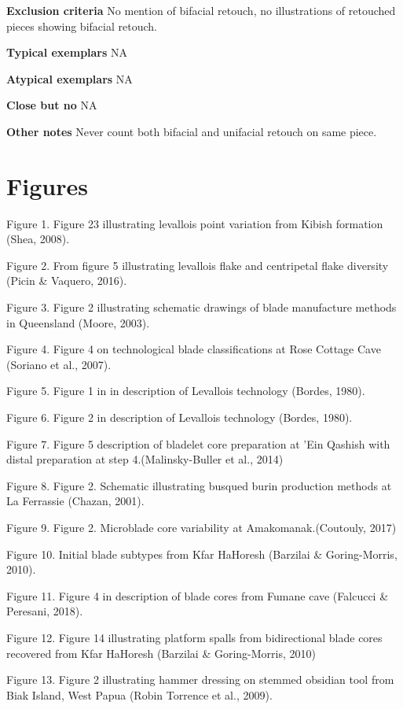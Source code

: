\documentclass[
]{article}
\begin{document}
\textbf{Exclusion criteria} No mention of bifacial retouch, no
illustrations of retouched pieces showing bifacial retouch.

\textbf{Typical exemplars} NA

\textbf{Atypical exemplars} NA

\textbf{Close but no} NA

\textbf{Other notes} Never count both bifacial and unifacial retouch on
same piece.

\hypertarget{figures}{%
\section{Figures}\label{figures}}

Figure 1. Figure 23 illustrating levallois point variation from Kibish
formation (Shea, 2008).

Figure 2. From figure 5 illustrating levallois flake and centripetal
flake diversity (Picin \& Vaquero, 2016).

Figure 3. Figure 2 illustrating schematic drawings of blade manufacture
methods in Queensland (Moore, 2003).

Figure 4. Figure 4 on technological blade classifications at Rose
Cottage Cave (Soriano et al., 2007).

Figure 5. Figure 1 in in description of Levallois technology (Bordes,
1980).

Figure 6. Figure 2 in description of Levallois technology (Bordes,
1980).

Figure 7. Figure 5 description of bladelet core preparation at 'Ein
Qashish with distal preparation at step 4.(Malinsky-Buller et al., 2014)

Figure 8. Figure 2. Schematic illustrating busqued burin production
methods at La Ferrassie (Chazan, 2001).

Figure 9. Figure 2. Microblade core variability at Amakomanak.(Coutouly,
2017)

Figure 10. Initial blade subtypes from Kfar HaHoresh (Barzilai \&
Goring-Morris, 2010).

Figure 11. Figure 4 in description of blade cores from Fumane cave
(Falcucci \& Peresani, 2018).

Figure 12. Figure 14 illustrating platform spalls from bidirectional
blade cores recovered from Kfar HaHoresh (Barzilai \& Goring-Morris,
2010)

Figure 13. Figure 2 illustrating hammer dressing on stemmed obsidian
tool from Biak Island, West Papua (Robin Torrence et al., 2009).
\end{document}

